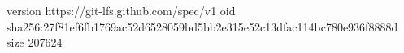version https://git-lfs.github.com/spec/v1
oid sha256:27f81ef6fb1769ac52d6528059bd5bb2e315e52c13dfac114bc780e936f8888d
size 207624
